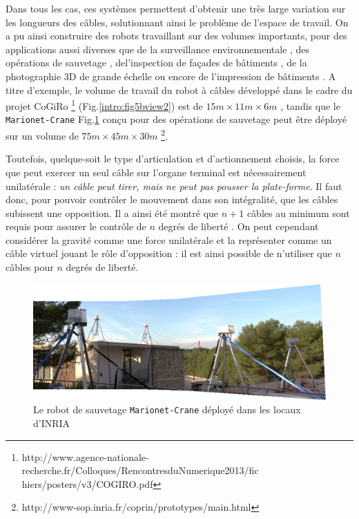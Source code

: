 Dans tous les cas, ces systèmes permettent d'obtenir une très large variation 
sur les longueurs des câbles, solutionnant ainsi le problème de l'espace de 
travail. On a pu ainsi construire des robots travaillant sur des volumes 
importants, pour des applications aussi diverses que de la surveillance 
environnementale \cite{jordan2007}\cite{borgstrom2009}, des op\'erations de 
sauvetage \cite{merlet2010}\cite{satoshi2002}\cite{bosscher2005}, 
del'inspection de fa\c cades de b\^atiments \cite{izard2013}, de la photographie 
3D de grande échelle \cite{deschenes2007} ou encore de l'impression de 
b\^atiments \cite{bosscher2007cc}. A titre d'exemple, le volume de travail du 
robot \`a c\^ables d\'evelopp\'e dans le cadre du projet CoGiRo 
\footnote{
http://www.agence-nationale-recherche.fr/Colloques/RencontresduNumerique2013/fic
hiers/posters/v3/COGIRO.pdf} (Fig.\ref{intro:fig5bview2}) est de $15m \times 
11m\times 6m$ \cite{sandretto2015}, tandis que le {\tt Marionet-Crane} 
Fig.\ref{intro:fig4b} con\c cu pour des opérations de sauvetage peut \^etre 
d\'eploy\'e sur un volume de $75m\times45m\times30m$ 
\footnote{http://www-sop.inria.fr/coprin/prototypes/main.html}.

Toutefois, quelque-soit le type d'articulation et d'actionnement choisis, la 
force que peut exercer un seul câble sur l'organe terminal est nécessairement 
unilatérale : {\em un câble peut tirer, mais ne peut pas pousser la 
plate-forme}. Il faut donc, pour pouvoir contrôler le mouvement dans son 
intégralité, que les câbles subissent une opposition. Il a ainsi été montré que 
$n+1$ câbles au minimum sont requis pour assurer le contrôle de $n$ degrés de 
liberté \cite{1994:Ming.Higuchi}. On peut cependant considérer la gravité comme 
une force unilatérale et la représenter comme un câble virtuel jouant le rôle 
d'opposition : il est ainsi possible de n'utiliser que $n$ câbles pour $n$ 
degrés de liberté.

\begin{figure}[!ht]
  \centering
\includegraphics[width=.98\linewidth]{./chapter0/figures/marionet_crane.jpg}
    \caption{\footnotesize Le robot de sauvetage {\tt Marionet-Crane} 
d\'eploy\'e dans les locaux d'INRIA}
\label{intro:fig4b}
\end{figure}

